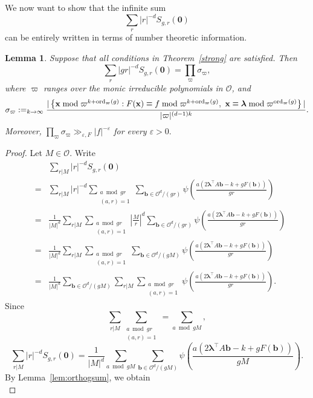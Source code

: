 \documentclass[10pt]{amsart}
\theoremstyle{plain}
\theoremstyle{plain}
\newtheorem{lemma}[theorem]{Lemma}
\renewcommand{\vec}[1]{\mathbf{#1}}
\theoremstyle{remark}
\theoremstyle{definition}
\let\lim=\relax
\DeclareMathOperator*{\lim}{lim}
\newcommand{\ord}{\textup{ord}}
\begin{document}
We now want to show that the infinite sum
\[\sum_{r}|r|^{-d}S_{g,r}(\vec{0})\]
can be entirely written in terms of number theoretic information.
\begin{lemma}\label{lem:densitysum} Suppose that all  conditions in Theorem~\ref{strong} are  satisfied. Then
\[\sum_{r}|gr|^{-d}S_{g,r}(\vec{0})=\prod_{\varpi}\sigma_{\varpi},\]
where $\varpi$ ranges over the monic irreducible polynomials in $\mathcal{O}$, and
\[\sigma_{\varpi}:=\lim_{k\rightarrow\infty}\frac{|\left\{\vec{x}\bmod \varpi^{k+\ord_\varpi(g)}:F(\vec{x})\equiv f\bmod\varpi^{k+\ord_\varpi(g)},\ \vec{x}\equiv\boldsymbol{\lambda}\bmod\varpi^{\ord_{\varpi}(g)}\right\}|}{|\varpi|^{(d-1)k}}.\]
Moreover,
\(
\prod_{\varpi}\sigma_{\varpi} \gg_{\varepsilon,F} |f|^{-\varepsilon}
\)
for every $\varepsilon>0.$
\end{lemma}
\begin{proof} Let $M\in \mathcal{O}.$ 
Write
\begin{eqnarray*}
&&\sum_{r|M}|r|^{-d}S_{g,r}(\vec{0})\\&=&\sum_{r|M}|r|^{-d}\sum_{\substack{a\bmod gr\\ (a,r)=1}}\sum_{\vec{b}\in\mathcal{O}^d/(gr)}\psi\left(\frac{a(2\boldsymbol{\lambda}^{\intercal}A\vec{b}-k+gF(\vec{b}))}{gr}\right)\\&=&\frac{1}{|M|^d}\sum_{r|M}\sum_{\substack{a\bmod gr\\ (a,r)=1}}\left|\frac{M}{r}\right|^d\sum_{\vec{b}\in\mathcal{O}^d/(gr)}\psi\left(\frac{a(2\boldsymbol{\lambda}^{\intercal}A\vec{b}-k+gF(\vec{b}))}{gr}\right)\\&=&\frac{1}{|M|^d}\sum_{r|M}\sum_{\substack{a\bmod gr\\ (a,r)=1}}\sum_{\vec{b}\in\mathcal{O}^d/(gM)}\psi\left(\frac{a(2\boldsymbol{\lambda}^{\intercal}A\vec{b}-k+gF(\vec{b}))}{gr}\right)\\&=& \frac{1}{|M|^d}\sum_{\vec{b}\in\mathcal{O}^d/(gM)}\sum_{r|M}\sum_{\substack{a\bmod gr\\ (a,r)=1}}\psi\left(\frac{a(2\boldsymbol{\lambda}^{\intercal}A\vec{b}-k+gF(\vec{b}))}{gr}\right).
\end{eqnarray*}
Since
\[\sum_{r|M}\sum_{\substack{a\bmod gr\\ (a,r)=1}}=\sum_{a\bmod gM},\]
\[\sum_{r|M}|r|^{-d}S_{g,r}(\vec{0})=\frac{1}{|M|^d}\sum_{a\bmod gM}\sum_{\vec{b}\in\mathcal{O}^d/(gM)}\psi\left(\frac{a(2\boldsymbol{\lambda}^{\intercal}A\vec{b}-k+gF(\vec{b}))}{gM}\right).\]
By Lemma~\ref{lem:orthogsum}, we obtain 
\begin{equation}\label{sh}

\end{equation}
\end{proof}
\end{document}
